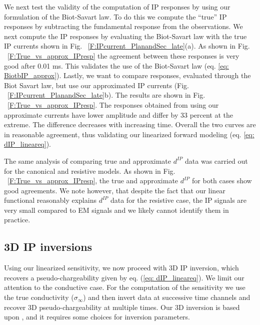 \documentclass[extra,mreferee]{gji}
\newcommand{\siginf}{\sigma_\infty}
\newcommand{\dip}{d^{IP}}
\begin{document}
We next test the validity of the computation of IP responses by using our formulation of the Biot-Savart law. To do this we compute the ``true'' IP responses  by subtracting the fundamental response from the observations. We next compute the IP responses by evaluating the Biot-Savart law with the true IP currents shown in Fig. ~\ref{F:IPcurrent_PlanandSec_late}(a). As shown in Fig. ~\ref{F:True_vs_approx_IPresp} the agreement between these responses is very good after 0.01 ms. This validates the use of the Biot-Savart law (eq. \ref{eq: BiotbIP_approx}). Lastly, we want to compare responses, evaluated through the Biot Savart law, but use our approximated IP currents (Fig. ~\ref{F:IPcurrent_PlanandSec_late}b). The results are shown in Fig. ~\ref{F:True_vs_approx_IPresp}. The responses obtained from using our approximate currents have lower amplitude and differ by 33 percent at the extreme. The difference decreases with increasing time. Overall the two curves are in reasonable agreement, thus validating our linearized forward modeling (eq. \ref{eq: dIP_lineareq}).

The same analysis of comparing true and approximate $\dip$ data was carried out for the canonical and resistive models. 
As shown in  Fig. ~\ref{F:True_vs_approx_IPresp}, the true and approximate $\dip$ for both cases show good agreements.
We note however, that despite the fact that our linear functional reasonably explains $\dip$ data for the resistive case, the IP signals are very small compared to EM signals and we likely cannot identify them in practice.


\subsection{3D IP inversions}
Using our linearized sensitivity, we now proceed with 3D IP inversion, which recovers a pseudo-chargeability given by eq. (\ref{eq: dIP_lineareq}). 
We limit our attention to the conductive case. For the computation of the sensitivity we use the true conductivity ($\siginf$) and then invert data at successive time channels and recover 3D pseudo-chargeability at multiple times. 
Our 3D inversion is based upon \cite[]{doug1994,Li2000}, and it requires some choices for inversion parameters. 
\end{document}
